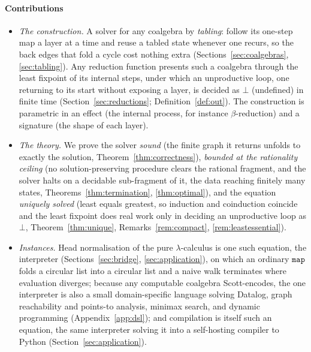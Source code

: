 \paragraph{Contributions}
\begin{itemize}
  \item \emph{The construction.} A solver for any coalgebra by \emph{tabling}: follow its
    one-step map a layer at a time and reuse a tabled state whenever one recurs, so the back
    edges that fold a cycle cost nothing extra (Sections~\ref{sec:coalgebras},
    \ref{sec:tabling}). Any reduction function presents such a coalgebra through the least
    fixpoint of its internal steps, under which an unproductive loop, one returning to its
    start without exposing a layer, is decided as $\bot$ (undefined) in finite time
    (Section~\ref{sec:reductions}; Definition~\ref{def:out}). The construction is parametric in
    an effect (the internal process, for instance $\beta$-reduction) and a signature (the shape
    of each layer).
  \item \emph{The theory.} We prove the solver \emph{sound} (the finite graph it returns
    unfolds to exactly the solution, Theorem~\ref{thm:correctness}), \emph{bounded at the rationality ceiling} (no
    solution-preserving procedure clears the rational fragment, and the solver halts on a decidable
    sub-fragment of it, the data reaching finitely many states, Theorems~\ref{thm:termination},
    \ref{thm:optimal}), and the equation
    \emph{uniquely solved} (least equals greatest, so induction and coinduction coincide and
    the least fixpoint does real work only in deciding an unproductive loop as $\bot$,
    Theorem~\ref{thm:unique}, Remarks~\ref{rem:compact}, \ref{rem:leastessential}).
  \item \emph{Instances.} Head normalisation of the pure $\lambda$-calculus is one such equation,
    the interpreter (Sections~\ref{sec:bridge}, \ref{sec:application}), on which an ordinary
    $\mathtt{map}$ folds a circular list into a circular list and a naive walk terminates where
    evaluation diverges; because any computable coalgebra Scott-encodes, the one interpreter is also a small
    domain-specific language solving Datalog, graph reachability and points-to analysis, minimax
    search, and dynamic programming (Appendix~\ref{app:dsl}); and compilation is itself such an
    equation, the same interpreter solving it into a self-hosting compiler to Python
    (Section~\ref{sec:application}).
\end{itemize}

